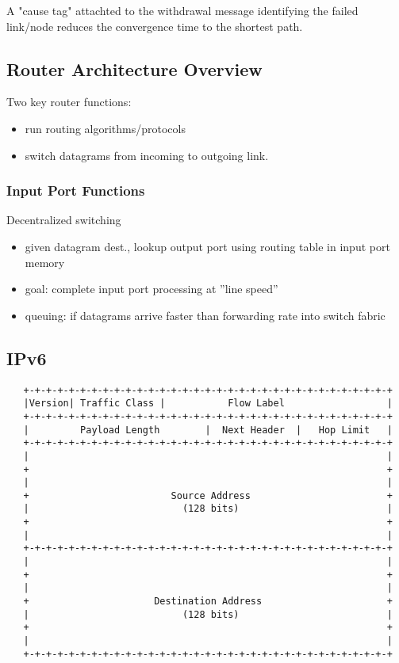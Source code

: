 \documentclass[10pt, a4paper, twocolumn]{scrartcl}
\begin{document}
A "cause tag" attachted to the withdrawal message identifying the failed link/node reduces the convergence time to the shortest path.

\subsection{Router Architecture Overview}

Two key router functions:
\begin{itemize}
	\item run routing algorithms/protocols
	\item switch datagrams from incoming to outgoing link.
\end{itemize}

\subsubsection{Input Port Functions}

Decentralized switching
\begin{itemize}
	\item given datagram dest., lookup output port using routing table in input port memory
	\item goal: complete input port processing at ''line speed''
	\item queuing: if datagrams arrive faster than forwarding rate into switch fabric
\end{itemize}

\subsection{IPv6}

\scriptsize
\begin{verbatim}
   +-+-+-+-+-+-+-+-+-+-+-+-+-+-+-+-+-+-+-+-+-+-+-+-+-+-+-+-+-+-+-+-+
   |Version| Traffic Class |           Flow Label                  |
   +-+-+-+-+-+-+-+-+-+-+-+-+-+-+-+-+-+-+-+-+-+-+-+-+-+-+-+-+-+-+-+-+
   |         Payload Length        |  Next Header  |   Hop Limit   |
   +-+-+-+-+-+-+-+-+-+-+-+-+-+-+-+-+-+-+-+-+-+-+-+-+-+-+-+-+-+-+-+-+
   |                                                               |
   +                                                               +
   |                                                               |
   +                         Source Address                        +
   |                           (128 bits)                          |
   +                                                               +
   |                                                               |
   +-+-+-+-+-+-+-+-+-+-+-+-+-+-+-+-+-+-+-+-+-+-+-+-+-+-+-+-+-+-+-+-+
   |                                                               |
   +                                                               +
   |                                                               |
   +                      Destination Address                      +
   |                           (128 bits)                          |
   +                                                               +
   |                                                               |
   +-+-+-+-+-+-+-+-+-+-+-+-+-+-+-+-+-+-+-+-+-+-+-+-+-+-+-+-+-+-+-+-+
\end{verbatim}
\normalsize
\end{document}

